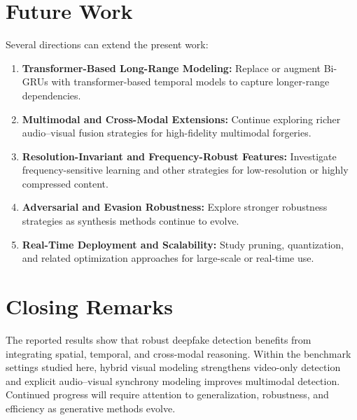 \section{Future Work}
Several directions can extend the present work:
\begin{enumerate}
    \item \textbf{Transformer-Based Long-Range Modeling:} Replace or augment Bi-GRUs with transformer-based temporal models to capture longer-range dependencies.
    \item \textbf{Multimodal and Cross-Modal Extensions:} Continue exploring richer audio--visual fusion strategies for high-fidelity multimodal forgeries.
    \item \textbf{Resolution-Invariant and Frequency-Robust Features:} Investigate frequency-sensitive learning and other strategies for low-resolution or highly compressed content.
    \item \textbf{Adversarial and Evasion Robustness:} Explore stronger robustness strategies as synthesis methods continue to evolve.
    \item \textbf{Real-Time Deployment and Scalability:} Study pruning, quantization, and related optimization approaches for large-scale or real-time use.
\end{enumerate}

\section{Closing Remarks}
The reported results show that robust deepfake detection benefits from integrating spatial, temporal, and cross-modal reasoning. Within the benchmark settings studied here, hybrid visual modeling strengthens video-only detection and explicit audio--visual synchrony modeling improves multimodal detection. Continued progress will require attention to generalization, robustness, and efficiency as generative methods evolve.